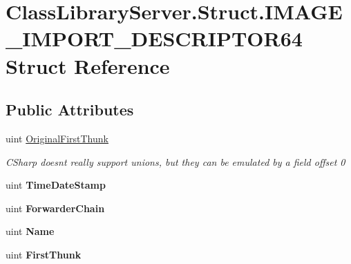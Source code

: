 \hypertarget{struct_class_library_server_1_1_struct_1_1_i_m_a_g_e___i_m_p_o_r_t___d_e_s_c_r_i_p_t_o_r64}{}\section{Class\+Library\+Server.\+Struct.\+I\+M\+A\+G\+E\+\_\+\+I\+M\+P\+O\+R\+T\+\_\+\+D\+E\+S\+C\+R\+I\+P\+T\+O\+R64 Struct Reference}
\label{struct_class_library_server_1_1_struct_1_1_i_m_a_g_e___i_m_p_o_r_t___d_e_s_c_r_i_p_t_o_r64}
\subsection*{Public Attributes}
\begin{DoxyCompactItemize}
\item 
uint \mbox{\hyperlink{struct_class_library_server_1_1_struct_1_1_i_m_a_g_e___i_m_p_o_r_t___d_e_s_c_r_i_p_t_o_r64_a9f7c1543d5cfeffc4b03e290e7f423e6}{Original\+First\+Thunk}}
\begin{DoxyCompactList}\small\item\em C\+Sharp doesnt really support unions, but they can be emulated by a field offset 0 \end{DoxyCompactList}\item 
\mbox{\label{struct_class_library_server_1_1_struct_1_1_i_m_a_g_e___i_m_p_o_r_t___d_e_s_c_r_i_p_t_o_r64_a2167627f4c56f3737d0a8646c8a7c3f1}} 
uint {\bfseries Time\+Date\+Stamp}
\item 
\mbox{\label{struct_class_library_server_1_1_struct_1_1_i_m_a_g_e___i_m_p_o_r_t___d_e_s_c_r_i_p_t_o_r64_a47b5a7cf251fa984820d66f7cca78384}} 
uint {\bfseries Forwarder\+Chain}
\item 
\mbox{\label{struct_class_library_server_1_1_struct_1_1_i_m_a_g_e___i_m_p_o_r_t___d_e_s_c_r_i_p_t_o_r64_a9562fc6ad69c0202ab5f776ab3368a5b}} 
uint {\bfseries Name}
\item 
\mbox{\label{struct_class_library_server_1_1_struct_1_1_i_m_a_g_e___i_m_p_o_r_t___d_e_s_c_r_i_p_t_o_r64_a5790e741dcfead1f7e2d35454a6df26b}} 
uint {\bfseries First\+Thunk}
\end{DoxyCompactItemize}



